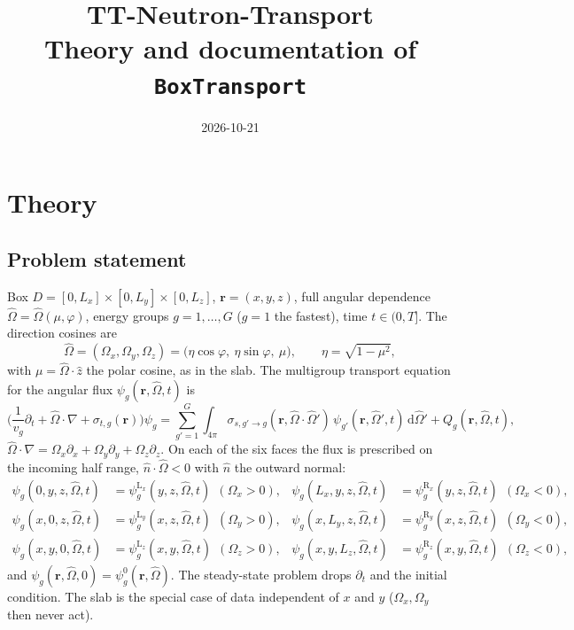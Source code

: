 \documentclass[11pt,a4paper]{article}
\title{TT-Neutron-Transport\\[2pt]\large Theory and documentation of \texttt{BoxTransport}}
\date{2026-10-21}
\newcommand{\Om}{\hat{\Omega}}
\newcommand{\dd}{\mathrm{d}}
\begin{document}
\maketitle
\sloppy
\tableofcontents

\section{Theory}
\label{sec:theory}

\subsection{Problem statement}
\label{sec:problem}

Box $D=[0,L_x]\times[0,L_y]\times[0,L_z]$, $\bm r=(x,y,z)$, full angular dependence $\Om=\Om(\mu,\varphi)$, energy groups $g=1,\dots,G$ ($g=1$ the fastest), time $t\in(0,T]$. The direction cosines are
\begin{equation}
\Om=(\Omega_x,\Omega_y,\Omega_z)=\big(\eta\cos\varphi,\ \eta\sin\varphi,\ \mu\big),\qquad \eta=\sqrt{1-\mu^2},
\label{eq:cosines}
\end{equation}
with $\mu=\Om\cdot\hat z$ the polar cosine, as in the slab. The multigroup transport equation for the angular flux $\psi_g(\bm r,\Om,t)$ is
\begin{equation}
\Big(\frac{1}{v_g}\partial_t+\Om\cdot\nabla+\sigma_{t,g}(\bm r)\Big)\psi_g
=\sum_{g'=1}^{G}\int_{4\pi}\sigma_{s,g'\to g}(\bm r,\Om\cdot\Om')\,\psi_{g'}(\bm r,\Om',t)\,\dd\Om'+Q_g(\bm r,\Om,t),
\label{eq:transport}
\end{equation}
$\Om\cdot\nabla=\Omega_x\partial_x+\Omega_y\partial_y+\Omega_z\partial_z$. On each of the six faces the flux is prescribed on the incoming half range, $\hat n\cdot\Om<0$ with $\hat n$ the outward normal:
\begin{equation}
\begin{aligned}
\psi_g(0,y,z,\Om,t)&=\psi^{\mathrm L_x}_g(y,z,\Om,t)\ \ (\Omega_x>0), &
\psi_g(L_x,y,z,\Om,t)&=\psi^{\mathrm R_x}_g(y,z,\Om,t)\ \ (\Omega_x<0),\\
\psi_g(x,0,z,\Om,t)&=\psi^{\mathrm L_y}_g(x,z,\Om,t)\ \ (\Omega_y>0), &
\psi_g(x,L_y,z,\Om,t)&=\psi^{\mathrm R_y}_g(x,z,\Om,t)\ \ (\Omega_y<0),\\
\psi_g(x,y,0,\Om,t)&=\psi^{\mathrm L_z}_g(x,y,\Om,t)\ \ (\Omega_z>0), &
\psi_g(x,y,L_z,\Om,t)&=\psi^{\mathrm R_z}_g(x,y,\Om,t)\ \ (\Omega_z<0),
\end{aligned}
\label{eq:bc}
\end{equation}
and $\psi_g(\bm r,\Om,0)=\psi^0_g(\bm r,\Om)$. The steady-state problem drops $\partial_t$ and the initial condition. The slab is the special case of data independent of $x$ and $y$ ($\Omega_x,\Omega_y$ then never act).
\end{document}
